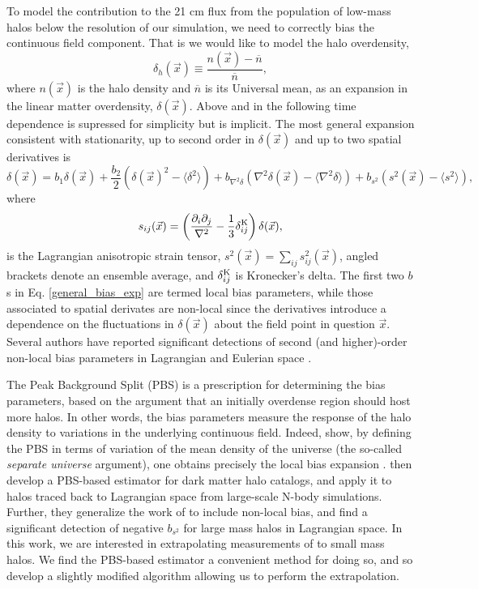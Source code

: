To model the contribution to the 21 cm flux from the population of low-mass halos below the resolution of our simulation, we need to correctly bias the continuous field component. That is we would like to model the halo overdensity,
\begin{equation}
\delta_h(\vec{x}) \equiv \frac{n(\vec{x}) - \overline{n}}{\overline{n}},
\end{equation}
where $n(\vec{x})$ is the halo density and $\overline{n}$ is its Universal mean, as an expansion in the linear matter overdensity, $\delta(\vec{x})$. Above and in the following time dependence is supressed for simplicity but is implicit. The most general expansion consistent with stationarity, up to second order in $\delta(\vec{x})$ and up to two spatial derivatives is
\begin{equation}
\delta(\vec{x}) = b_1 \delta(\vec{x}) + \frac{b_2}{2} \left( \delta(\vec{x})^2 - \langle \delta^2 \rangle \right)+ b_{\nabla^2\delta} \left( \nabla^2\delta(\vec{x}) - \langle \nabla^2\delta \rangle \right) + b_{s^2} \left( s^2(\vec{x}) - \langle s^2 \rangle \right), \label{general_bias_exp}
\end{equation}
where
\begin{equation}
s_{ij}(\vec{x}) = \left( \frac{\partial_i \partial_j}{\nabla^2} - \frac{1}{3}\delta^{\rm K}_{ij}\right) \delta(\vec{x}),
\end{equation}
is the Lagrangian anisotropic strain tensor, $s^2(\vec{x}) = \sum_{ij} s^2_{ij}(\vec{x})$, angled brackets denote an ensemble average, and $\delta_{ij}^{\rm K}$ is Kronecker's delta. The first two $b$s in Eq. \ref{general_bias_exp} are termed local bias parameters, while those associated to spatial derivates are non-local since the derivatives introduce a dependence on the fluctuations in $\delta(\vec{x})$ about the field point in question $\vec{x}$. Several authors have reported significant detections of second (and higher)-order non-local bias parameters in Lagrangian \citep{shethetal2013, biagettietal2014, modietal2017, abidi+baldauf2018} and Eulerian space \cite{lazeyrasetal2017}.

The Peak Background Split (PBS) is a prescription for determining the bias parameters, based on the argument that an initially overdense region should host more halos. In other words, the bias parameters measure the response of the halo density to variations in the underlying continuous field. Indeed, \citeauthor{schmidt2013} show, by defining the PBS in terms of variation of the mean density of the universe (the so-called \textit{separate universe} argument), one obtains precisely the local bias expansion \citep{biasreview}. \citeauthor{modietal2017} then develop a PBS-based estimator for dark matter halo catalogs, and apply it to halos traced back to Lagrangian space from large-scale N-body simulations. Further, they generalize the work of \citeauthor{schmidt2013} to include non-local bias, and find a significant detection of negative $b_{s^2}$ for large mass halos in Lagrangian space. In this work, we are interested in extrapolating measurements of  \citeauthor{modietal2017} to small mass halos. We find the PBS-based estimator a convenient method for doing so, and so develop a slightly modified algorithm allowing us to perform the extrapolation. 

